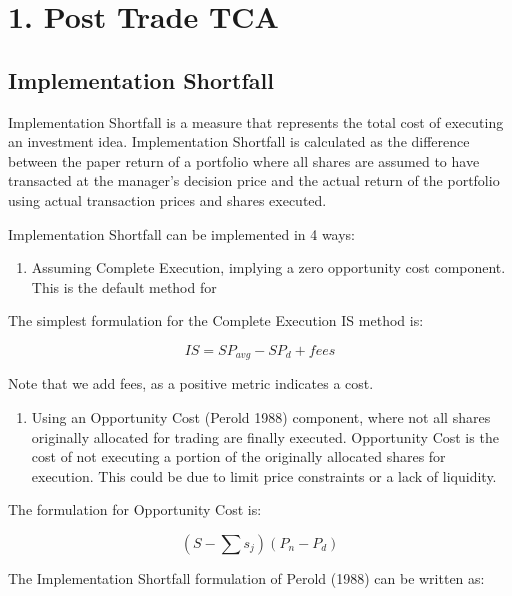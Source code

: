 \hypertarget{post-trade-tca}{%
\section{1. Post Trade TCA}\label{post-trade-tca}}

\hypertarget{implementation-shortfall}{%
\subsection{Implementation Shortfall}\label{implementation-shortfall}}

Implementation Shortfall is a measure that represents the total cost of
executing an investment idea. Implementation Shortfall is calculated as
the difference between the paper return of a portfolio where all shares
are assumed to have transacted at the manager's decision price and the
actual return of the portfolio using actual transaction prices and
shares executed.

Implementation Shortfall can be implemented in 4 ways:

\begin{enumerate}
\def\labelenumi{\arabic{enumi}.}
\tightlist
\item
  Assuming Complete Execution, implying a zero opportunity cost
  component. This is the default method for
\end{enumerate}

The simplest formulation for the Complete Execution IS method is:

\[ IS = S P_{avg} - S P_{d} + fees \]

Note that we add fees, as a positive metric indicates a cost.

\begin{enumerate}
\def\labelenumi{\arabic{enumi}.}
\setcounter{enumi}{1}
\tightlist
\item
  Using an Opportunity Cost (Perold 1988) component, where not all
  shares originally allocated for trading are finally executed.
  Opportunity Cost is the cost of not executing a portion of the
  originally allocated shares  for execution. This could be due
  to limit price constraints or a lack of liquidity.
\end{enumerate}

The formulation for Opportunity Cost is:

\[ (S - \sum s_{j}) (P_{n} - P_{d}) \]

The Implementation Shortfall formulation of Perold (1988) can be written
as:

